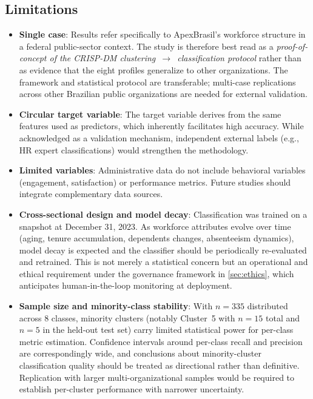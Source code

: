 \documentclass[alpha-refs,english]{RBCA_v3.0}
\begin{document}
\subsection{Limitations}
\begin{itemize}
    \item \textbf{Single case}: Results refer specifically to ApexBrasil's workforce structure in a federal public-sector context. The study is therefore best read as a \textit{proof-of-concept of the CRISP-DM clustering~$\rightarrow$~classification protocol} rather than as evidence that the eight profiles generalize to other organizations. The framework and statistical protocol are transferable; multi-case replications across other Brazilian public organizations are needed for external validation.
    \item \textbf{Circular target variable}: The target variable derives from the same features used as predictors, which inherently facilitates high accuracy. While acknowledged as a validation mechanism, independent external labels (e.g., HR expert classifications) would strengthen the methodology.
    \item \textbf{Limited variables}: Administrative data do not include behavioral variables (engagement, satisfaction) or performance metrics. Future studies should integrate complementary data sources.
    \item \textbf{Cross-sectional design and model decay}: Classification was trained on a snapshot at December 31, 2023. As workforce attributes evolve over time (aging, tenure accumulation, dependents changes, absenteeism dynamics), model decay is expected and the classifier should be periodically re-evaluated and retrained. This is not merely a statistical concern but an operational and ethical requirement under the governance framework in \cref{sec:ethics}, which anticipates human-in-the-loop monitoring at deployment.
    \item \textbf{Sample size and minority-class stability}: With $n=335$ distributed across 8 classes, minority clusters (notably Cluster~5 with $n=15$ total and $n=5$ in the held-out test set) carry limited statistical power for per-class metric estimation. Confidence intervals around per-class recall and precision are correspondingly wide, and conclusions about minority-cluster classification quality should be treated as directional rather than definitive. Replication with larger multi-organizational samples would be required to establish per-cluster performance with narrower uncertainty.
\end{itemize}
\end{document}
